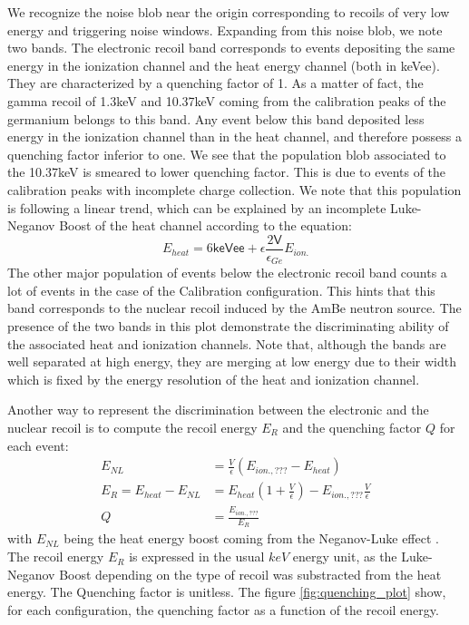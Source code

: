 We recognize the noise blob near the origin corresponding to recoils of very low energy and triggering noise windows. Expanding from this noise blob, we note two bands. 
The electronic recoil band corresponds to events depositing the same energy in the ionization channel and the heat energy channel (both in keVee). They are characterized by a quenching factor of 1. As a matter of fact, the gamma recoil of 1.3keV and 10.37keV coming from the calibration peaks of the germanium belongs to this band. Any event below this band deposited less energy in the ionization channel than in the heat channel, and therefore possess a quenching factor inferior to one. We see that the population blob associated to the 10.37keV is smeared to lower quenching factor. This is due to events of the calibration peaks with incomplete charge collection. We note that this population is following a linear trend, which can be explained by an incomplete Luke-Neganov Boost of the heat channel according to the equation:
\begin{equation}
E_{heat} = 6 \textsf{keVee} + \epsilon \frac{2 \textsf{V}}{\epsilon_{Ge}} E_{ion.}
\end{equation}
The other major population of events below the electronic recoil band counts a lot of events in the case of the Calibration configuration. This hints that this band corresponds to the nuclear recoil induced by the AmBe neutron source.
The presence of the two bands in this plot demonstrate the discriminating ability of the associated heat and ionization channels. Note that, although the bands are well separated at high energy, they are merging at low energy due to their width which is fixed by the energy resolution of the heat and ionization channel.

Another way to represent the discrimination between the electronic and the nuclear recoil is to compute the recoil energy $E_R$ and the quenching factor $Q$ for each event:
\begin{align}
\label{eq:quenching-from-ecei}
	E_{NL} &= \frac{V}{\epsilon} ( E_{ion., ???} - E_{heat} )
	\\
	E_R = E_{heat} - E_{NL} &= E_{heat} \left( 1 + \frac{V}{\epsilon} \right) - E_{ion., ???} \frac{V}{\epsilon}
	\\
	Q &= \frac{E_{ion., ???}}{E_R}
\end{align}
with $E_{NL}$ being the heat energy boost coming from the Neganov-Luke effect \cite{luke-neganov-effect}.
The recoil energy $E_R$ is expressed in the usual $keV$ energy unit, as the Luke-Neganov Boost depending on the type of recoil was substracted from the heat energy. The Quenching factor is unitless.
The figure \ref{fig:quenching_plot} show, for each configuration, the quenching factor as a function of the recoil energy.

